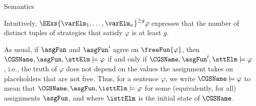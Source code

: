 \begin{subsection}{Semantics}
\begin{definition}
			                \end{definition}
			
			
		
			Intuitively, $^{
			\geq g} \varphi\!$ expresses that the number of
			distinct tuples of strategies that satisfy $\varphi$ is at least $g$.

		As usual, if $\asgFun$ and $\asgFun'$ agree on $\freeFun{\varphi}$, then
		$\CGSName, \asgFun,\sttElm \models \varphi$ if and only if $\CGSName, \asgFun',\sttElm \models \varphi$, i.e., the
		truth of $\varphi$ does not depend on the values the assignment takes on placeholders that are not free.
		Thus, for a sentence $\varphi$, we write $\CGSName \models \varphi$ to mean
		that $\CGSName, \asgFun, \isttElm \models \varphi$ for some (equivalently, for all)
		assignments $\asgFun$, and where $\isttElm$ is the initial state of $\CGSName$.
	\end{subsection}
	
